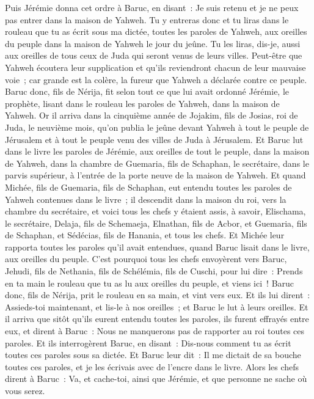 \begin{multicols}{2}
Puis Jérémie donna cet ordre à Baruc, en disant~: Je suis retenu et je ne peux pas entrer dans la maison de Yahweh.
Tu y entreras donc et tu liras dans le rouleau que tu as écrit sous ma dictée, toutes les paroles de Yahweh, aux oreilles du peuple dans la maison de Yahweh le jour du jeûne. Tu les liras, dis-je, aussi aux oreilles de tous ceux de Juda qui seront venus de leurs villes.
Peut-être que Yahweh écoutera leur supplication et qu'ils reviendront chacun de leur mauvaise voie~; car grande est la colère, la fureur que Yahweh a déclarée contre ce peuple.
Baruc donc, fils de Nérija, fit selon tout ce que lui avait ordonné Jérémie, le prophète, lisant dans le rouleau les paroles de Yahweh, dans la maison de Yahweh.
Or il arriva dans la cinquième année de Jojakim, fils de Josias, roi de Juda, le neuvième mois, qu'on publia le jeûne devant Yahweh à tout le peuple de Jérusalem et à tout le peuple venu des villes de Juda à Jérusalem.
Et Baruc lut dans le livre les paroles de Jérémie, aux oreilles de tout le peuple, dans la maison de Yahweh, dans la chambre de Guemaria, fils de Schaphan, le secrétaire, dans le parvis supérieur, à l'entrée de la porte neuve de la maison de Yahweh.
Et quand Michée, fils de Guemaria, fils de Schaphan, eut entendu toutes les paroles de Yahweh contenues dans le livre~;
il descendit dans la maison du roi, vers la chambre du secrétaire, et voici tous les chefs y étaient assis, à savoir, Elischama, le secrétaire, Delaja, fils de Schemaeja, Elnathan, fils de Acbor, et Guemaria, fils de Schaphan, et Sédécias, fils de Hanania, et tous les chefs.
Et Michée leur rapporta toutes les paroles qu'il avait entendues, quand Baruc lisait dans le livre, aux oreilles du peuple.
C'est pourquoi tous les chefs envoyèrent vers Baruc, Jehudi, fils de Nethania, fils de Schélémia, fils de Cuschi, pour lui dire~: Prends en ta main le rouleau que tu as lu aux oreilles du peuple, et viens ici~! Baruc donc, fils de Nérija, prit le rouleau en sa main, et vint vers eux.
Et ils lui dirent~: Assieds-toi maintenant, et lis-le à nos oreilles~; et Baruc le lut à leurs oreilles.
Et il arriva que sitôt qu'ils eurent entendu toutes les paroles, ils furent effrayés entre eux, et dirent à Baruc~: Nous ne manquerons pas de rapporter au roi toutes ces paroles.
Et ils interrogèrent Baruc, en disant~: Dis-nous comment tu as écrit toutes ces paroles sous sa dictée.
Et Baruc leur dit~: Il me dictait de sa bouche toutes ces paroles, et je les écrivais avec de l'encre dans le livre.
Alors les chefs dirent à Baruc~: Va, et cache-toi, ainsi que Jérémie, et que personne ne sache où vous serez.

\end{multicols}
